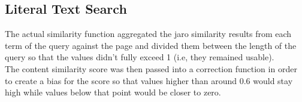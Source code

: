 \subsection{Literal Text Search}

The actual similarity function aggregated the jaro similarity results from each term of the query against the page and divided them between the length of the query so that the values didn't fully exceed 1 (i.e, they remained usable). \\

The content similarity score was then passed into a correction function in order to create a bias for the score so that values higher than around 0.6 would stay high while values below that point would be closer to zero.

